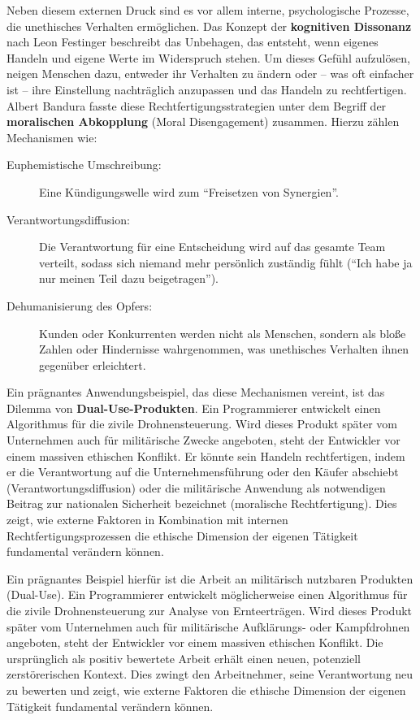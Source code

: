 \documentclass[
    12pt,               %
    a4paper,            %
    ngerman             %
]{scrartcl}
\begin{document}
Neben diesem externen Druck sind es vor allem interne, psychologische Prozesse, die unethisches Verhalten ermöglichen. Das Konzept der \textbf{kognitiven Dissonanz} nach Leon Festinger beschreibt das Unbehagen, das entsteht, wenn eigenes Handeln und eigene Werte im Widerspruch stehen. Um dieses Gefühl aufzulösen, neigen Menschen dazu, entweder ihr Verhalten zu ändern oder – was oft einfacher ist – ihre Einstellung nachträglich anzupassen und das Handeln zu rechtfertigen. Albert Bandura fasste diese Rechtfertigungsstrategien unter dem Begriff der \textbf{moralischen Abkopplung} (Moral Disengagement) zusammen. Hierzu zählen Mechanismen wie:

\begin{description}
    \item[Euphemistische Umschreibung:] Eine Kündigungswelle wird zum \enquote{Freisetzen von Synergien}.
    \item[Verantwortungsdiffusion:] Die Verantwortung für eine Entscheidung wird auf das gesamte Team verteilt, sodass sich niemand mehr persönlich zuständig fühlt (\enquote{Ich habe ja nur meinen Teil dazu beigetragen}).
    \item[Dehumanisierung des Opfers:] Kunden oder Konkurrenten werden nicht als Menschen, sondern als bloße Zahlen oder Hindernisse wahrgenommen, was unethisches Verhalten ihnen gegenüber erleichtert.
\end{description}

Ein prägnantes Anwendungsbeispiel, das diese Mechanismen vereint, ist das Dilemma von \textbf{Dual-Use-Produkten}. Ein Programmierer entwickelt einen Algorithmus für die zivile Drohnensteuerung. Wird dieses Produkt später vom Unternehmen auch für militärische Zwecke angeboten, steht der Entwickler vor einem massiven ethischen Konflikt. Er könnte sein Handeln rechtfertigen, indem er die Verantwortung auf die Unternehmensführung oder den Käufer abschiebt (Verantwortungsdiffusion) oder die militärische Anwendung als notwendigen Beitrag zur nationalen Sicherheit bezeichnet (moralische Rechtfertigung). Dies zeigt, wie externe Faktoren in Kombination mit internen Rechtfertigungsprozessen die ethische Dimension der eigenen Tätigkeit fundamental verändern können.

Ein prägnantes Beispiel hierfür ist die Arbeit an militärisch nutzbaren Produkten (Dual-Use). Ein Programmierer entwickelt möglicherweise einen Algorithmus für die zivile Drohnensteuerung zur Analyse von Ernteerträgen. Wird dieses Produkt später vom Unternehmen auch für militärische Aufklärungs- oder Kampfdrohnen angeboten, steht der Entwickler vor einem massiven ethischen Konflikt. Die ursprünglich als positiv bewertete Arbeit erhält einen neuen, potenziell zerstörerischen Kontext. Dies zwingt den Arbeitnehmer, seine Verantwortung neu zu bewerten und zeigt, wie externe Faktoren die ethische Dimension der eigenen Tätigkeit fundamental verändern können.
\end{document}
